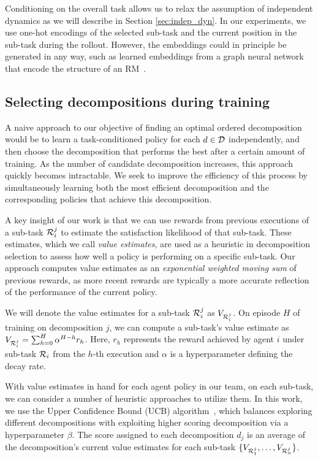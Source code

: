 Conditioning on the overall task allows us to relax the assumption of independent dynamics as we will describe in Section \ref{sec:indep_dyn}. In our experiments, we use one-hot encodings of the selected sub-task and the current position in the sub-task during the rollout. However, the embeddings could in principle be generated in any way, such as learned embeddings from a graph neural network that encode the structure of an RM~\cite{yalcinkaya2023automata}.


\subsection{Selecting decompositions during training}
\label{subsec:decomp_strategies}


A naive approach to our objective of finding an optimal ordered decomposition would be to learn a task-conditioned policy for each $d \in \mathcal{D}$ independently, and then choose the decomposition that performs the best after a certain amount of training. As the number of candidate decomposition increases, this approach quickly becomes intractable. We seek to improve the efficiency of this process by simultaneously learning both the most efficient decomposition and the corresponding policies that achieve this decomposition. 

A key insight of our work is that we can use rewards from previous executions of a sub-task $\mathcal{R}_{i}^{j}$ to estimate the satisfaction likelihood of that sub-task. These estimates, which we call \textit{value estimates}, are used as a heuristic in decomposition selection to assess how well a policy is performing on a specific sub-task. Our approach computes value estimates as an \textit{exponential weighted moving sum} of previous rewards, as more recent rewards are typically a more accurate reflection of the performance of the current policy.

We will denote the value estimates for a sub-task $\mathcal{R}_{i}^{j}$ as $V_{\mathcal{R}_{i}^{j}}$. On episode $H$ of training on decomposition $j$, we can compute a sub-task's value estimate as $V_{\mathcal{R}_{i}^{j}} = \sum_{h=0}^H \alpha^{H-h} r_h$. Here, $ r_h$ represents the reward achieved by agent $i$ under sub-task $\mathcal{R}_i$ from the $h$-th execution and $\alpha$ is a hyperparameter defining the decay rate.

With value estimates in hand for each agent policy in our team, on each sub-task, we can consider a number of heuristic approaches to utilize them. In this work, we use the Upper Confidence Bound (UCB) algorithm~\cite{auer02ucb}, which balances exploring different decompositions with exploiting higher scoring decomposition via a hyperparameter $\beta$. The score assigned to each decomposition $d_j$ is an average of the decomposition's current value estimates for each sub-task $\{V_{\mathcal{R}_{1}^{j}}, \dots, V_{\mathcal{R}_{n}^{j}} \}$.


